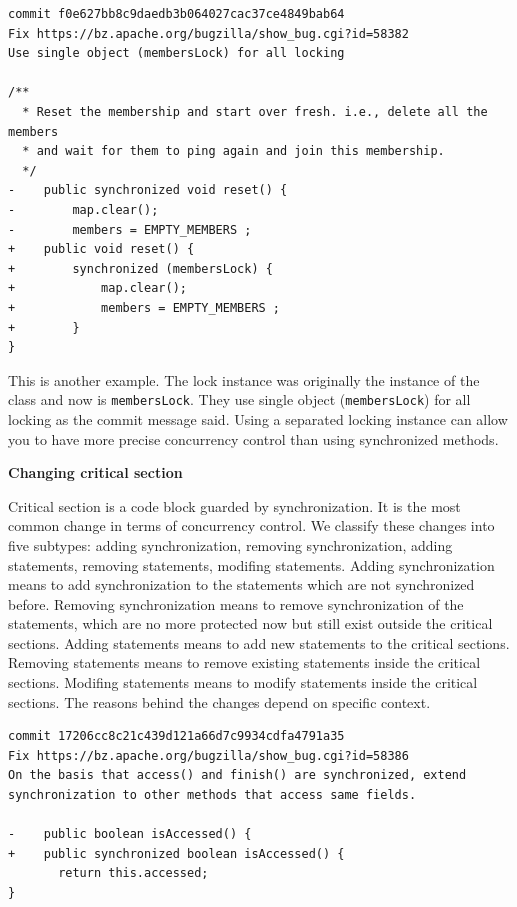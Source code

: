 \begin{lstlisting}
commit f0e627bb8c9daedb3b064027cac37ce4849bab64
Fix https://bz.apache.org/bugzilla/show_bug.cgi?id=58382
Use single object (membersLock) for all locking

/**
  * Reset the membership and start over fresh. i.e., delete all the members
  * and wait for them to ping again and join this membership.
  */
-    public synchronized void reset() {
-        map.clear();
-        members = EMPTY_MEMBERS ;
+    public void reset() {
+        synchronized (membersLock) {
+            map.clear();
+            members = EMPTY_MEMBERS ;
+        }
}
\end{lstlisting}

This is another example. The lock instance was originally the instance of the class and now is \texttt{membersLock}. They use single object (\texttt{membersLock}) for all locking as the commit message said. Using a separated locking instance can allow you to have more precise concurrency control than using synchronized methods.

\textbf{Changing critical section}

Critical section is a code block guarded by synchronization. It is the most common change in terms of concurrency control. We classify these changes into five subtypes: adding synchronization, removing synchronization, adding statements, removing statements, modifing statements. Adding synchronization means to add synchronization to the statements which are not synchronized before. Removing synchronization means to remove synchronization of the statements, which are no more protected now but still exist outside the critical sections. Adding statements means to add new statements to the critical sections. Removing statements means to remove existing statements inside the critical sections. Modifing statements means to modify statements inside the critical sections. The reasons behind the changes depend on specific context.

\begin{lstlisting}
commit 17206cc8c21c439d121a66d7c9934cdfa4791a35
Fix https://bz.apache.org/bugzilla/show_bug.cgi?id=58386
On the basis that access() and finish() are synchronized, extend synchronization to other methods that access same fields.

-    public boolean isAccessed() {
+    public synchronized boolean isAccessed() {
       return this.accessed;
}
\end{lstlisting}

